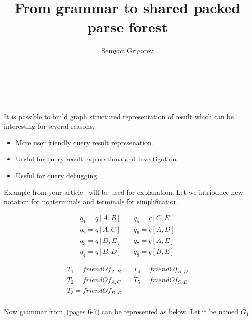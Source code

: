\documentclass{sig-alternate}
\begin{document}
\makeatletter
\def\@copyrightspace{\relax}
\makeatother

\title{From grammar to shared packed parse forest}

\sloppy


\author{
\alignauthor
       Semyon Grigorev\\
       \\
       \\
       \\
}

\maketitle

It is possible to build graph structured representation of result which can be interesting for several reasons.
\begin{itemize}
\item More user friendly query result represenation. 
\item Useful for query result explorationa and investigation.
\item Useful for query debugging.
\end{itemize}

Example from your article~\cite{jelle} will be used for explanation. Let we intrioduce new notation for nonterminals and terminals for simplification.

\begin{align*}
q_1 = q[A,B] \quad & q_5 = q[C,E] \\
q_2 = q[A,C] \quad & q_6 = q[A,D] \\
q_3 = q[D,E] \quad & q_7 = q[A,E] \\
q_4 = q[B,D] \quad & q_8 = q[B,E] 
\end{align*}

\begin{align*}
T_1 = friendOf_{A,B} \quad & T_4 = friendOf_{B,D}\\
T_2 = friendOf_{A,C} \quad & T_5 = friendOf_{C,E} \\
T_3 = friendOf_{D,E} \quad &  \\
\end{align*}

Now grammar from~\cite{jelle}(pages 6-7) can be represented as below. Let it be named $G_1$
\end{document}
